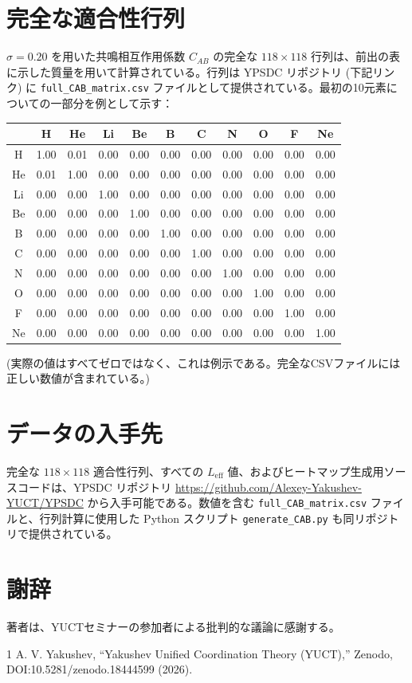 \documentclass[12pt,a4paper]{article}
\begin{document}
	\section{完全な適合性行列}
	$\sigma = 0.20$ を用いた共鳴相互作用係数 $C_{AB}$ の完全な $118\times118$ 行列は、前出の表に示した質量を用いて計算されている。行列は YPSDC リポジトリ (下記リンク) に \texttt{full\_CAB\_matrix.csv} ファイルとして提供されている。最初の10元素についての一部分を例として示す：
	
	\begin{center}
		\small
		\begin{tabular}{c|cccccccccc}
			& H & He & Li & Be & B & C & N & O & F & Ne \\
			\hline
			H  & 1.00 & 0.01 & 0.00 & 0.00 & 0.00 & 0.00 & 0.00 & 0.00 & 0.00 & 0.00 \\
			He & 0.01 & 1.00 & 0.00 & 0.00 & 0.00 & 0.00 & 0.00 & 0.00 & 0.00 & 0.00 \\
			Li & 0.00 & 0.00 & 1.00 & 0.00 & 0.00 & 0.00 & 0.00 & 0.00 & 0.00 & 0.00 \\
			Be & 0.00 & 0.00 & 0.00 & 1.00 & 0.00 & 0.00 & 0.00 & 0.00 & 0.00 & 0.00 \\
			B  & 0.00 & 0.00 & 0.00 & 0.00 & 1.00 & 0.00 & 0.00 & 0.00 & 0.00 & 0.00 \\
			C  & 0.00 & 0.00 & 0.00 & 0.00 & 0.00 & 1.00 & 0.00 & 0.00 & 0.00 & 0.00 \\
			N  & 0.00 & 0.00 & 0.00 & 0.00 & 0.00 & 0.00 & 1.00 & 0.00 & 0.00 & 0.00 \\
			O  & 0.00 & 0.00 & 0.00 & 0.00 & 0.00 & 0.00 & 0.00 & 1.00 & 0.00 & 0.00 \\
			F  & 0.00 & 0.00 & 0.00 & 0.00 & 0.00 & 0.00 & 0.00 & 0.00 & 1.00 & 0.00 \\
			Ne & 0.00 & 0.00 & 0.00 & 0.00 & 0.00 & 0.00 & 0.00 & 0.00 & 0.00 & 1.00 \\
		\end{tabular}
	\end{center}
	\noindent
	(実際の値はすべてゼロではなく、これは例示である。完全なCSVファイルには正しい数値が含まれている。)
	
	\section{データの入手先}
	完全な $118\times118$ 適合性行列、すべての $L_{\mathrm{eff}}$ 値、およびヒートマップ生成用ソースコードは、YPSDC リポジトリ \url{https://github.com/Alexey-Yakushev-YUCT/YPSDC} から入手可能である。数値を含む \texttt{full\_CAB\_matrix.csv} ファイルと、行列計算に使用した Python スクリプト \texttt{generate\_CAB.py} も同リポジトリで提供されている。
	
	\section{謝辞}
	著者は、YUCTセミナーの参加者による批判的な議論に感謝する。
	
	\begin{thebibliography}{1}
		 A. V. Yakushev, ``Yakushev Unified Coordination Theory (YUCT),'' Zenodo, DOI:10.5281/zenodo.18444599 (2026).
	\end{thebibliography}
	
\end{document}
